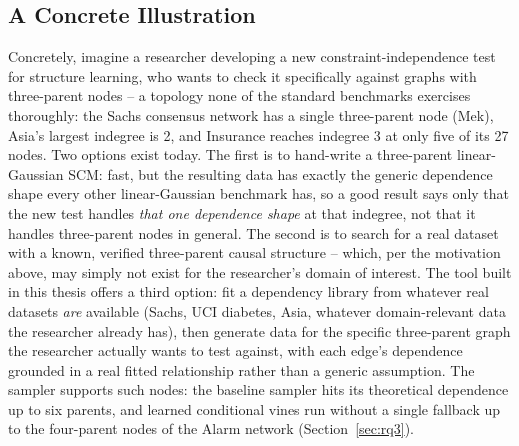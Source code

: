 \documentclass[
  english,
  class=report,
  accentcolor=2c,
  marginpar=false,
  parskip=half-,
  fontsize=11pt,
  ruledheaders=false,
  pdfa=false,
  IMRAD=false,
  thesis={type=master}
]{tudapub}
\begin{document}
\subsection{A Concrete Illustration}
Concretely, imagine a researcher developing a new constraint-independence
test for structure learning, who wants to check it specifically against
graphs with three-parent nodes -- a topology none of the standard
benchmarks exercises thoroughly: the Sachs consensus network has a single
three-parent node (Mek), Asia's largest indegree is 2, and Insurance reaches
indegree 3 at only five of its 27 nodes. Two options exist today. The first is to hand-write a
three-parent linear-Gaussian SCM: fast, but the resulting data has exactly
the generic dependence shape every other linear-Gaussian benchmark has,
so a good result says only that the new test handles \emph{that one
dependence shape} at that indegree, not that it handles three-parent nodes
in general. The second is to search for a real dataset with a known,
verified three-parent causal structure -- which, per the motivation above,
may simply not exist for the researcher's domain of interest. The tool
built in this thesis offers a third option: fit a dependency library from
whatever real datasets \emph{are} available (Sachs, UCI diabetes, Asia,
whatever domain-relevant data the researcher already has), then generate
data for the specific three-parent graph the researcher actually wants to
test against, with each edge's dependence grounded in a real fitted
relationship rather than a generic assumption. The sampler supports such
nodes: the baseline sampler hits its theoretical dependence up to six
parents, and learned conditional vines run without a single fallback up to
the four-parent nodes of the Alarm network (Section~\ref{sec:rq3}).
\end{document}
